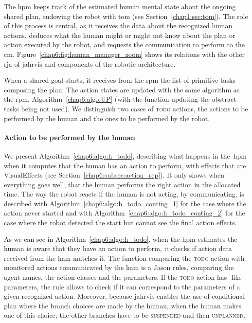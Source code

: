 \documentclass[a4paper,11pt,twoside]{StyleThese}
\begin{document}
The \acrfull{hpm} keeps track of the estimated human mental state about the ongoing shared plan, endowing the robot with \acrlong{tom} (see Section~\ref{chap1:sec:tom}). The role of this process is central, as it receives the data about the recognized human actions, deduces what the human might or might not know about the plan or action executed by the robot, and requests the communication to perform to the \acrfull{cm}. Figure~\ref{chap6:fig:human_manager_zoom} shows its relations with the other \acrshort{rja} of \acrshort{jahrvis} and components of the robotic architecture.

When a shared goal starts, it receives from the \acrshort{rpm} the list of primitive tasks composing the plan. The action states are updated with the same algorithm as the \acrshort{rpm}, Algorithm~\ref{chap6:algo:UP} (with the function updating the abstract tasks being not used). We distinguish two cases of \textsc{todo} actions, the actions to be performed by the human and the ones to be performed by the robot.

\paragraph{Action to be performed by the human} We present Algorithm~\ref{chap6:algo:h_todo}, describing what happens in the~\acrshort{hpm} when it computes that the human has an action to perform, with effects that are VisualEffects (see Section~\ref{chap6:subsec:action_rep}). It only shows when everything goes well, \ie that the human performs the right action in the allocated time. The way the robot reacts if the human is not acting, by communicating, is described with Algorithm~\ref{chap6:algo:h_todo_conting_1} for the case where the action never started and with Algorithm~\ref{chap6:algo:h_todo_conting_2} for the case where the robot detected the start but cannot see the final action effects.

As we can see in Algorithm~\ref{chap6:algo:h_todo}, when the \acrshort{hpm} estimates the human is aware that they have an action to perform, it checks if action data received from the \acrlong{ham} matches it. The function comparing the \textsc{todo} action with monitored actions communicated by the \acrshort{ham} is a Jason rules, comparing the agent names, the action classes and the parameters. If the \textsc{todo} action has \sparql-like parameters, the rule allows to check if it can correspond to the parameters of a given recognized action. Moreover, because \acrshort{jahrvis} enables the use of conditional plan where the branch choices are made by the human, when the human makes one of this choice, the other branches have to be \textsc{suspended} and then \textsc{unplanned}.
\end{document}
